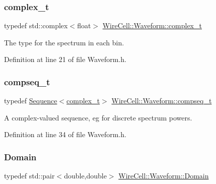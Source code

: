 \subsubsection{\texorpdfstring{complex\+\_\+t}{complex\_t}}
{\footnotesize\ttfamily typedef std\+::complex$<$float$>$ \hyperlink{namespace_wire_cell_1_1_waveform_a4a69305e16ea32b03030a13a52478c38}{Wire\+Cell\+::\+Waveform\+::complex\+\_\+t}}



The type for the spectrum in each bin. 



Definition at line 21 of file Waveform.\+h.

\mbox{\label{namespace_wire_cell_1_1_waveform_a7e4a8d371f774438bb360e7d1dcb583a}} 
\subsubsection{\texorpdfstring{compseq\+\_\+t}{compseq\_t}}
{\footnotesize\ttfamily typedef \hyperlink{namespace_wire_cell_1_1_waveform_a1d2a1b672e3b220dcd64a994531de95d}{Sequence}$<$\hyperlink{namespace_wire_cell_1_1_waveform_a4a69305e16ea32b03030a13a52478c38}{complex\+\_\+t}$>$ \hyperlink{namespace_wire_cell_1_1_waveform_a7e4a8d371f774438bb360e7d1dcb583a}{Wire\+Cell\+::\+Waveform\+::compseq\+\_\+t}}



A complex-\/valued sequence, eg for discrete spectrum powers. 



Definition at line 34 of file Waveform.\+h.

\mbox{\label{namespace_wire_cell_1_1_waveform_aa783b1c2a84242349d5c798b7483727b}} 
\subsubsection{\texorpdfstring{Domain}{Domain}}
{\footnotesize\ttfamily typedef std\+::pair$<$double,double$>$ \hyperlink{namespace_wire_cell_1_1_waveform_aa783b1c2a84242349d5c798b7483727b}{Wire\+Cell\+::\+Waveform\+::\+Domain}}

